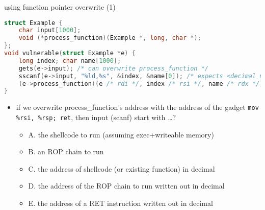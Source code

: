 \begin{frame}[fragile,label=useFPtrOverwrite1]{using function pointer overwrite (1)}
\begin{lstlisting}[language=C,style=script]
struct Example {
    char input[1000];
    void (*process_function)(Example *, long, char *);
};
void vulnerable(struct Example *e) {
    long index; char name[1000];
    gets(e->input); /* can overwrite process_function */
    sscanf(e->input, "%ld,%s", &index, &name[0]); /* expects <decimal number>,<string> */
    (e->process_function)(e /* rdi */, index /* rsi */, name /* rdx */);
}
\end{lstlisting}
\begin{itemize}
\item \small if we overwrite process\_function's address with the address of the gadget
    \texttt{mov \%rsi, \%rsp; ret}, then input (scanf) start with \ldots?
    \begin{itemize}
    \item A. the shellcode to run (assuming exec+writeable memory)
    \item B. an ROP chain to run
    \item C. the address of shellcode (or existing function) in decimal
    \item D. the address of the ROP chain to run written out in decimal
    \item E. the address of a RET instruction written out in decimal
    \end{itemize}
\end{itemize}
\end{frame}

